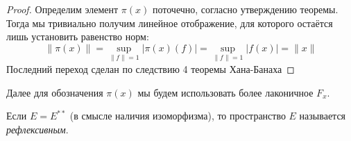 \begin{proof}
	Определим элемент $\pi(x)$ поточечно, согласно утверждению теоремы. Тогда мы тривиально получим линейное отображение, для которого остаётся лишь установить равенство норм:
	\[
		\|\pi(x)\| = \sup_{\|f\| = 1} |\pi(x)(f)| = \sup_{\|f\| = 1} |f(x)| = \|x\|
	\]
	Последний переход сделан по следствию 4 теоремы Хана-Банаха
\end{proof}

\begin{note}
	Далее для обозначения $\pi(x)$ мы будем использовать более лаконичное $F_x$.
\end{note}

\begin{definition}
	Если $E = E^{**}$ (в смысле наличия изоморфизма), то пространство $E$ называется \textit{рефлексивным}.
\end{definition}